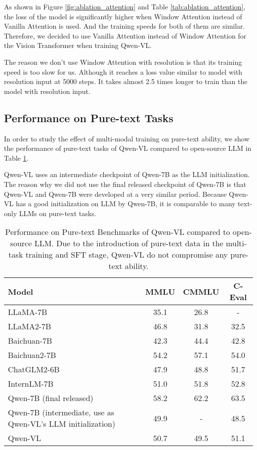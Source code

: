 \documentclass{article}
\newcommand{\tablestyle}[2]{\setlength{\tabcolsep}{#1}\renewcommand{\arraystretch}{#2}\centering\footnotesize}
\begin{document}
As shown in Figure \ref{fig:ablation_attention} and Table \ref{tab:ablation_attention}, the loss of the model is significantly higher when Window Attention instead of Vanilla Attention is used. And the training speeds for both of them are similar. Therefore, we decided to use Vanilla Attention instead of Window Attention for the Vision Transformer when training Qwen-VL.

The reason we don't use Window Attention with  resolution is that its training speed is too slow for us. Although it reaches a loss value similar to model with  resolution input at 5000 steps. It takes almost 2.5 times longer to train than the model with  resolution input.


\subsection{Performance on Pure-text Tasks}

In order to study the effect of multi-modal training on pure-text ability, we show the performance of pure-text tasks of Qwen-VL compared to open-source LLM in Table \ref{tab:pure_text}.

Qwen-VL uses an intermediate checkpoint of Qwen-7B as the LLM initialization. The reason why we did not use the final released checkpoint of Qwen-7B is that Qwen-VL and Qwen-7B were developed at a very similar period. Because Qwen-VL has a good initialization on LLM by Qwen-7B, it is comparable to many text-only LLMs on pure-text tasks.

\begin{table}[ht]
\centering
\caption{Performance on Pure-text Benchmarks of Qwen-VL compared to open-source LLM. Due to the introduction of pure-text data in the multi-task training and SFT stage, Qwen-VL do not compromise any pure-text ability.}
\tablestyle{7pt}{1.3}
\begin{tabular}{@{}l|ccc@{}}
\toprule
Model & MMLU & CMMLU & C-Eval \\ \midrule
LLaMA-7B & 35.1 & 26.8 & - \\
LLaMA2-7B & 46.8 & 31.8 & 32.5 \\
Baichuan-7B & 42.3 & 44.4 & 42.8 \\
Baichuan2-7B & 54.2 & 57.1 & 54.0 \\
ChatGLM2-6B & 47.9 & 48.8 & 51.7 \\
InternLM-7B & 51.0 & 51.8 & 52.8 \\ 
Qwen-7B (final released) & 58.2 & 62.2 & 63.5 \\ \midrule
Qwen-7B (intermediate, use as Qwen-VL's LLM initialization) & 49.9 & - & 48.5 \\
Qwen-VL & 50.7 & 49.5 & 51.1 \\ \bottomrule
\end{tabular}
\label{tab:pure_text}
\end{table}
\end{document}
